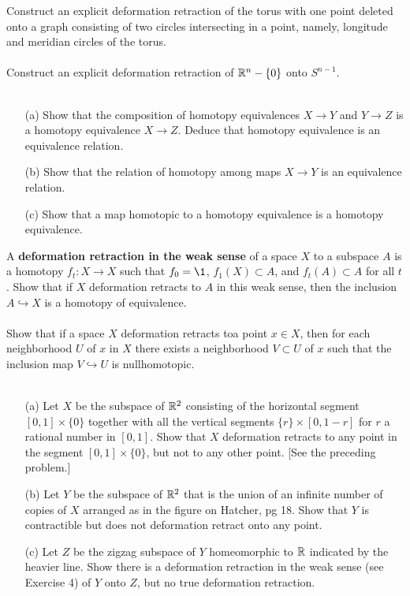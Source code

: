 
 Construct an explicit deformation retraction of the torus with one point deleted onto a graph consisting of two circles intersecting in a point, namely, longitude and meridian circles of the torus. 
\\
\\
 Construct an explicit deformation retraction of $\mathbb{R}^n-\{0\}$ onto $S^{n-1}$.
\\
\\
\begin{itemize}
\item[(a)] Show that the composition of homotopy equivalences $X\to Y$ and $Y\to Z$ is a homotopy equivalence $X\to Z$. Deduce that homotopy equivalence is an equivalence relation.
\item[(b)] Show that the relation of homotopy among maps $X\to Y$ is an equivalence relation.
\item[(c)] Show that a map homotopic to a homotopy equivalence is a homotopy equivalence.
\end{itemize}

 A {\bf{deformation retraction in the weak sense}} of a space $X$ to a subspace $A$ is a homotopy $f_t\colon X\to X$ such that $f_0=\1$, $f_1(X)\subset A$, and $f_t(A)\subset A$ for all $t$. Show that if $X$ deformation retracts to $A$ in this weak sense, then the inclusion $A\hookrightarrow X$ is a homotopy of equivalence.
\\
\\
 Show that if a space $X$ deformation retracts toa  point $x\in X$, then for each neighborhood $U$ of $x$ in $X$ there exists a neighborhood $V\subset U$ of $x$ such that the inclusion map $V\hookrightarrow U$ is nullhomotopic.
\\
\\
\begin{itemize}
\item[(a)] Let $X$ be the subspace of $\mathbb{R}^2$ consisting of the horizontal segment $[0,1]\times\{0\}$ together with all the vertical segments $\{r\}\times [0,1-r]$ for $r$ a rational number in $[0,1]$. Show that $X$ deformation retracts to any point in the segment $[0,1]\times\{0\}$, but not to any other point. [See the preceding problem.]
\item[(b)] Let $Y$ be the subspace of $\mathbb{R}^2$ that is the union of an infinite number of copies of $X$ arranged as in the figure on Hatcher, pg 18. Show that $Y$ is contractible but does not deformation retract onto any point.
\item[(c)] Let $Z$ be the zigzag subspace of $Y$ homeomorphic to $\mathbb{R}$ indicated by the heavier line. Show there is a deformation retraction in the weak sense (see Exercise 4) of $Y$ onto $Z$, but no true deformation retraction.
\end{itemize}

